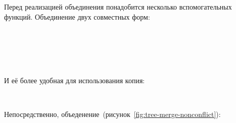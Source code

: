 Перед реализацией объединения понадобится несколько вспомогательных
функций. Объединение двух совместных форм:

\begin{code}%
\>\AgdaFunction{\_\textasciicircum\_} \AgdaSymbol{:} \AgdaSymbol{(}  \AgdaSymbol{:} \AgdaSymbol{)}      \<%
\\
\>\AgdaFunction{\_\textasciicircum\_}   \AgdaSymbol{(} \AgdaSymbol{)} \AgdaSymbol{=} \<%
\\
\>\AgdaFunction{\_\textasciicircum\_}   \AgdaSymbol{(} \AgdaSymbol{)} \AgdaSymbol{=} \<%
\\
\>\AgdaFunction{\_\textasciicircum\_} \AgdaSymbol{(}  \AgdaSymbol{)} \AgdaSymbol{(}  \AgdaSymbol{)} \AgdaSymbol{(}  \AgdaSymbol{)} \AgdaSymbol{=} \<[53]%
\>[53]\<%
\\
\>[0]\<[2]%
\>[2] \AgdaSymbol{((} \AgdaFunction{\textasciicircum} \AgdaSymbol{)} \AgdaSymbol{)} \AgdaSymbol{((} \AgdaFunction{\textasciicircum} \AgdaSymbol{)} \AgdaSymbol{)}\<%
\end{code}

И её более удобная для использования копия:

\begin{code}%
\> \AgdaSymbol{:} \AgdaSymbol{\{}  \AgdaSymbol{:} \AgdaSymbol{\}}      \<%
\\
\> \AgdaSymbol{\{}\AgdaSymbol{\}} \AgdaSymbol{\{}\AgdaSymbol{\}}  \AgdaSymbol{=} \AgdaSymbol{(} \AgdaFunction{\textasciicircum} \AgdaSymbol{)} \<%
\end{code}

Непосредственно, объеденение~(рисунок~\ref{fig:tree-merge-nonconflict}):

